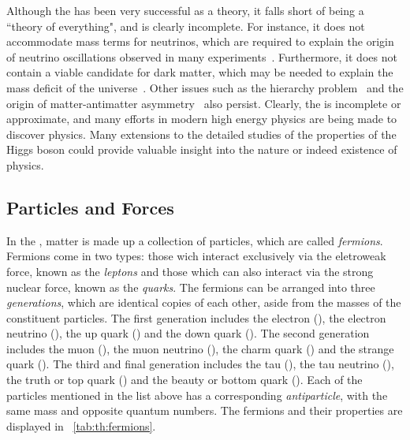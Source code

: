Although the \SM has been very successful as a theory, it falls short of being a “theory of everything", and is clearly incomplete. For instance, it does not accommodate mass terms for neutrinos, which are required to explain the origin of neutrino oscillations observed in many experiments~\cite{SuperK,SNO,DayaBay}. Furthermore, it does not contain a viable candidate for dark matter, which may be needed to explain the mass deficit of the universe~\cite{DM}. Other issues such as the hierarchy problem~\cite{Hierarchy} and the origin of matter-antimatter asymmetry~\cite{Asymmetry} also persist. Clearly, the \SM is incomplete or approximate, and many efforts in modern high energy physics are being made to discover \BSM physics. Many extensions to the  detailed studies of the properties of the Higgs boson could provide valuable insight into the nature or indeed existence of \BSM physics.



\subsection{Particles and Forces}

 In the \SM, matter is made up a collection of \SpinHalf particles, which are called \emph{fermions}. Fermions come in two types: those wich interact exclusively via the eletroweak force, known as the \emph{leptons} and those which can also interact via the strong nuclear force, known as the \emph{quarks}. The fermions can be arranged into three \emph{generations}, which are identical copies of each other, aside from the masses of the constituent particles. The first generation includes the electron (\Pe), the electron neutrino (\Pnue), the up quark (\Pup) and the down quark (\Pdown). The second generation includes the muon (\Pmu), the muon neutrino (\Pnum), the charm quark (\Pcharm) and the strange quark (\Pstrange). The third and final generation includes the tau (\Ptau), the tau neutrino (\Pnut), the truth or top quark (\Ptop) and the beauty or bottom quark (\Pbottom). Each of the particles mentioned in the list above has a corresponding \emph{antiparticle}, with the same mass and opposite quantum numbers.
The \SM fermions and their properties are displayed in \Tab~\ref{tab:th:fermions}.

